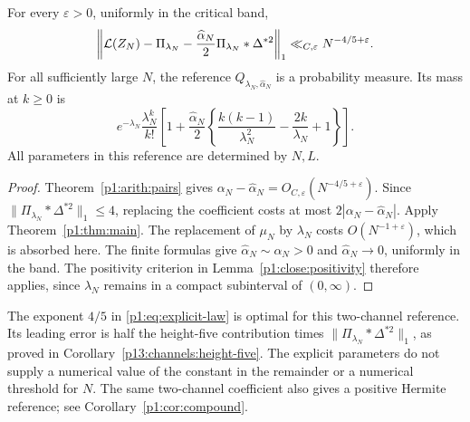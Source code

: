 \begin{corollary}
\label{p1:cor:explicit}
For every \(\varepsilon>0\), uniformly in the critical band,
\begin{equation}
 \left\|\mathcal L(Z_N)-\Pi_{\lambda_N}
       -\frac{\widehat\alpha_N}{2}
          \Pi_{\lambda_N}*\Delta^{*2}\right\|_1
       \ll_{C,\varepsilon}N^{-4/5+\varepsilon}.
 \label{p1:eq:explicit-law}
\end{equation}
For all sufficiently large \(N\), the reference
\(Q_{\lambda_N,\widehat\alpha_N}\) is a probability measure.
Its mass at \(k\ge0\) is
\begin{equation}
 e^{-\lambda_N}\frac{\lambda_N^k}{k!}
 \left[
  1+\frac{\widehat\alpha_N}{2}
       \left\{\frac{k(k-1)}{\lambda_N^2}
                    -\frac{2k}{\lambda_N}+1\right\}
 \right].
 \label{p1:eq:explicit-masses}
\end{equation}
All parameters in this reference are determined by \(N,L\).
\end{corollary}

\begin{proof}
Theorem~\ref{p1:arith:pairs} gives
\(\alpha_N-\widehat\alpha_N=O_{C,\varepsilon}(N^{-4/5+\varepsilon})\).
Since \(\|\Pi_{\lambda_N}*\Delta^{*2}\|_1\le4\), replacing the
coefficient costs at most \(2|\alpha_N-\widehat\alpha_N|\).
Apply Theorem~\ref{p1:thm:main}.
The replacement of \(\mu_N\) by \(\lambda_N\) costs
\(O(N^{-1+\varepsilon})\), which is absorbed here.
The finite formulas give
\(\widehat\alpha_N\sim\alpha_N>0\) and
\(\widehat\alpha_N\to0\), uniformly in the band.
The positivity criterion in Lemma~\ref{p1:close:positivity}
therefore applies, since \(\lambda_N\) remains in a compact
subinterval of \((0,\infty)\).
\end{proof}

The exponent \(4/5\) in \eqref{p1:eq:explicit-law} is optimal
for this two-channel reference. Its leading error is half the
height-five contribution times
\(\|\Pi_{\lambda_N}*\Delta^{*2}\|_1\), as proved in
Corollary~\ref{p13:channels:height-five}.
The explicit parameters do not supply a numerical value of
the constant in the remainder or a numerical threshold for \(N\).
The same two-channel coefficient also gives a positive Hermite
reference; see Corollary~\ref{p1:cor:compound}.

